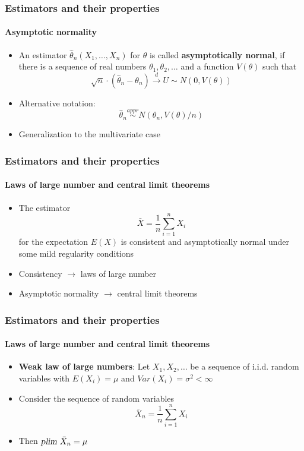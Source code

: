 \documentclass[notes=show]{beamer}
\begin{document}
\begin{frame}\frametitle{Estimators and their properties}\framesubtitle{Asymptotic normality}
\begin{itemize}
    \item An estimator $\hat{\theta}_{n}(X_{1},\ldots ,X_{n})$ for $\theta $ is called \textbf{asymptotically normal}, if there is a sequence of real numbers $\theta _{1},\theta _{2},\ldots $ and a function $V(\theta )$ such that
        \begin{equation*}
            \sqrt{n}\cdot \left( \hat{\theta}_{n}-\theta _{n}\right) \overset{d}{\rightarrow }U\sim N(0,V(\theta ))
        \end{equation*}
    \item Alternative notation:
    \begin{equation*}
        \hat{\theta}_{n}\overset{appr}{\sim }N(\theta _{n},V(\theta )/n)
    \end{equation*}
    \item Generalization to the multivariate case
\end{itemize}
\end{frame}


\begin{frame}\frametitle{Estimators and their properties}\framesubtitle{Laws of large number and central limit theorems}
\begin{itemize}
    \item The estimator
        \begin{equation*}
            \bar{X}=\frac{1}{n}\sum_{i=1}^{n}X_{i}
        \end{equation*}
        for the expectation $E(X)$ is consistent and asymptotically normal under some mild regularity conditions\medskip
    \item Consistency $\longrightarrow $ laws of large number
    \item Asymptotic normality $\longrightarrow $ central limit theorems
\end{itemize}
\end{frame}


\begin{frame}\frametitle{Estimators and their properties}\framesubtitle{Laws of large number and central limit theorems}
\begin{itemize}
    \item \textbf{Weak law of large numbers}: Let $X_{1},X_{2},\ldots $ be a sequence of i.i.d. random variables with $E(X_{i})=\mu $ and $Var(X_{i})=\sigma ^{2}<\infty $
    \item Consider the sequence of random variables
    \begin{equation*}
        \bar{X}_{n}=\frac{1}{n}\sum_{i=1}^{n}X_{i}
    \end{equation*}
    \item Then $\textsl{plim}~\bar{X}_{n}=\mu $
\end{itemize}
\end{frame}
\end{document}
